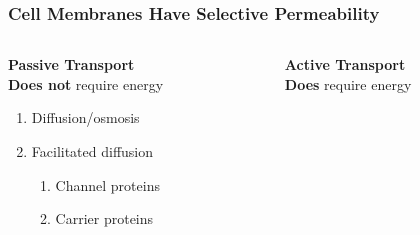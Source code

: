 \documentclass[10pt]{beamer}
\begin{document}
\begin{frame}[t]
\frametitle{Cell Membranes Have Selective Permeability}
\vspace{1.0cm}

	\begin{columns}[t]
		\begin{column}{0.5\textwidth}
			\Large{\textbf{\textcolor{myblue2}{Passive Transport}}}\normalsize{}\\
			\medskip
			\textbf{Does not} require energy\\
				\begin{enumerate}
					\item Diffusion/osmosis
					\item Facilitated diffusion
						\begin{enumerate}
							\item Channel proteins
							\item Carrier proteins
						\end{enumerate}
				\end{enumerate}
		\end{column}
		
		\begin{column}{0.5\textwidth}
			\Large{\textbf{\textcolor{myblue2}{Active Transport}}}\normalsize{}\\
			\medskip
			\textbf{Does} require energy\\
		\end{column}
	\end{columns}
\end{frame}
\end{document}
